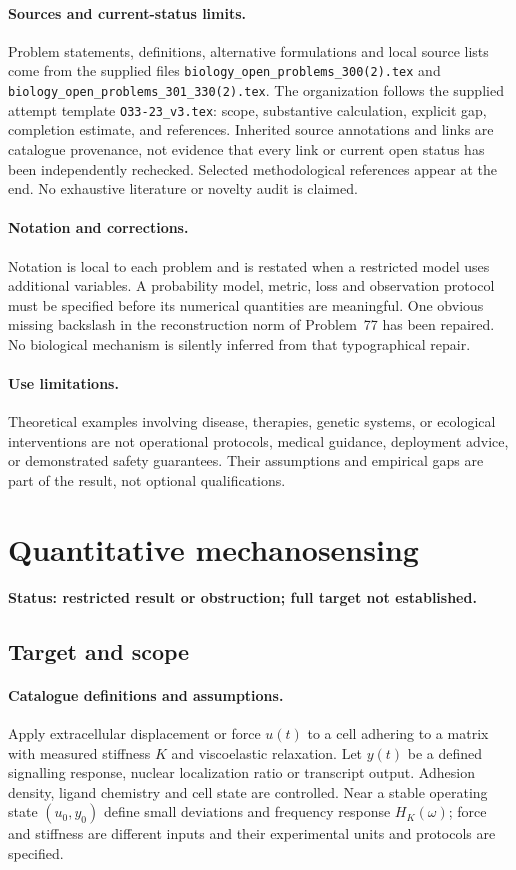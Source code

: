 \documentclass[11pt]{article}
\begin{document}
\paragraph{Sources and current-status limits.}
Problem statements, definitions, alternative formulations and local source lists
come from the supplied files
\texttt{biology\_open\_problems\_300(2).tex} and
\texttt{biology\_open\_problems\_301\_330(2).tex}.
The organization follows the supplied attempt template
\texttt{O33-23\_v3.tex}: scope, substantive calculation, explicit gap,
completion estimate, and references. Inherited source annotations and links are
catalogue provenance, not evidence that every link or current open status has
been independently rechecked. Selected methodological references appear at the
end. No exhaustive literature or novelty audit is claimed.

\paragraph{Notation and corrections.}
Notation is local to each problem and is restated when a restricted model uses
additional variables. A probability model, metric, loss and observation protocol
must be specified before its numerical quantities are meaningful. One obvious
missing backslash in the reconstruction norm of Problem~77 has been repaired.
No biological mechanism is silently inferred from that typographical repair.

\paragraph{Use limitations.}
Theoretical examples involving disease, therapies, genetic systems, or ecological
interventions are not operational protocols, medical guidance, deployment advice,
or demonstrated safety guarantees. Their assumptions and empirical gaps are part
of the result, not optional qualifications.


\section*{Quantitative mechanosensing}
\label{prob:099}
\noindent\textbf{Status: restricted result or obstruction; full target not established.}
\subsection{Target and scope}
\paragraph{Catalogue definitions and assumptions.}
Apply extracellular displacement or force $u(t)$ to a cell adhering to a matrix with measured stiffness $K$ and viscoelastic relaxation. Let $y(t)$ be a defined signalling response, nuclear localization ratio or transcript output. Adhesion density, ligand chemistry and cell state are controlled. Near a stable operating state $(u_0,y_0)$ define small deviations and frequency response $H_K(\omega)$; force and stiffness are different inputs and their experimental units and protocols are specified.
\end{document}
